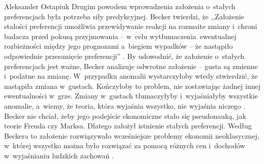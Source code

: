 \begin{artplenv}{Aleksander Ostapiuk}
Drugim powodem wprowadzenia założenia o~stałych preferencjach była potrzeba siły predykcyjnej. Becker twierdzi, że
,,Założenie stałości preferencji umożliwia przewidywanie reakcji na rozmaite zmiany i~chroni badacza przed pokusą
przyjmowania -- w~celu \guillemotleft wytłumaczenia\guillemotright\ 
ewentualnej rozbieżności między jego prognozami a~biegiem wypadków -- że
nastąpiło odpowiednie przesunięcie preferencji''
\parencite[s.~23]{becker_ekonomiczna_1990}.
By udowodnić, że
założenie o~stałych preferencjach jest ważne, Becker analizuje odwrotne założenie -- gusta są zmienne i~podatne na
zmianę. W~przypadku anomalii wystarczyłoby wtedy stwierdzić, że nastąpiła zmiana w~gustach. Kończyłoby to problem, nie
zostawiając żadnej innej ewentualności w~grze. Zmiany w~gustach tłumaczyłyby i~wyjaśniałyby wszystkie anomalie, a~wiemy,
że teoria, która wyjaśnia wszystko, nie wyjaśnia niczego
\parencite{popper_logic_1959}.
Becker nie chciał,
żeby jego podejście ekonomiczne stało się pseudonauką, jak teorie Freuda czy Marksa. Dlatego założył istnienie stałych
preferencji. Według Beckera to założenie rozwiązywało wcześniejsze problemy ekonomii neoklasycznej, w~której wszystko
można było rozwiązać za pomocą różnych cen i~dochodów w~wyjaśnianiu ludzkich zachowań
\parencite{becker_gustibus_1977}.


\end{artplenv}
